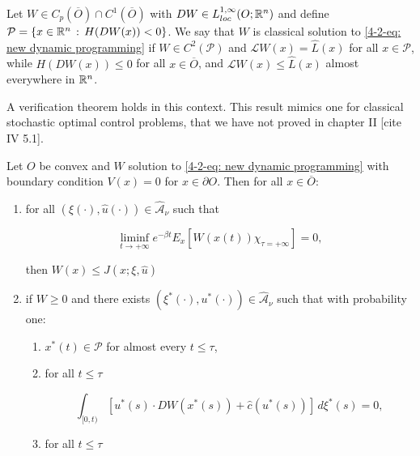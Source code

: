 \begin{definition}
    Let $W\in C_p(\overline{O})\cap C^1(\overline{O})$ with $DW\in L_{loc}^{1,\infty}(O;\mathbb{R}^n)$ and define $\mathcal{P}=\left\{x\in\mathbb{R}^n\,:\,H(DW(x))<0\right\}$. We say that $W$ is classical solution to \eqref{4-2-eq: new dynamic programming} if $W\in C^2(\mathcal{P})$ and $\mathcal{L}W(x)=\hat{L}(x)$ for all $x\in\mathcal{P}$, while $H(DW(x))\leq 0$ for all $x\in\overline{O}$, and $\mathcal{L}W(x)\leq \hat{L}(x)$ almost everywhere in $\mathbb{R}^n$.  
\end{definition}


A verification theorem holds in this context. This result mimics one for classical stochastic optimal control problems, that we have not proved in chapter II [cite IV 5.1].

\begin{theorem}
    Let $O$ be convex and $W$ solution to \eqref{4-2-eq: new dynamic programming} with boundary condition $V(x)=0$ for $x\in\partial O$. Then for all $x\in\overline{O}$:
    
    \begin{enumerate}[label=(\arabic*.)]
        \item for all $(\xi(\cdot),\hat{u}(\cdot))\in\hat{\mathcal{A}}_{\nu}$ such that
        
        \begin{equation}
            \liminf_{t\to+\infty} e^{-\beta t}E_x\left[W(x(t))\chi_{\tau=+\infty}\right] = 0,
        \end{equation}

        then $W(x)\leq J(x;\xi,\hat{u})$

        \item if $W\geq 0$ and there exists $(\xi^{\ast}(\cdot),u^{\ast}(\cdot))\in\hat{\mathcal{A}}_{\nu}$ such that with probability one:
        
        \begin{enumerate}[label=(2.\alph*.)]
            \item \label{4-2: fisrt bullet point} $x^{\ast}(t)\in\mathcal{P}$ for almost every $t\leq \tau$,
            \item \label{4-2: second bullet point} for all $t\leq\tau$
            
            \[\int_{[0,t)} \left[u^{\ast}(s)\cdot DW(x^{\ast}(s)) + \hat{c}(u^{\ast}(s))\right]\,d\xi^{\ast}(s) = 0,\]

            \item \label{4-2: third} for all $t\leq \tau$
            

\end{enumerate}
\end{enumerate}
\end{theorem}
